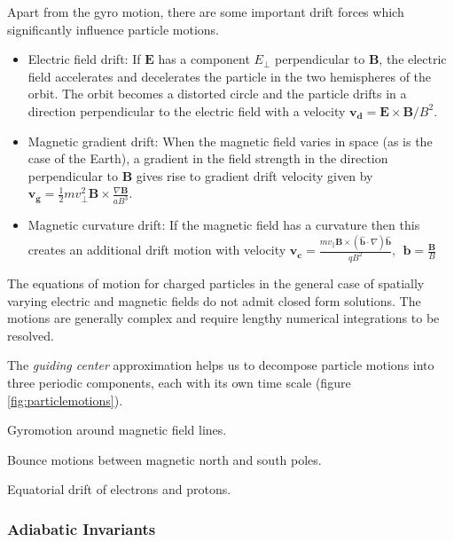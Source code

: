 Apart from the gyro motion, there are some important drift forces which significantly influence particle motions.

\begin{itemize}
    \item Electric field drift: If $\mathbf{E}$ has a component $E_{\perp}$ perpendicular to $\mathbf{B}$, the electric 
    field accelerates and decelerates the particle in the two hemispheres of the orbit. The orbit becomes 
    a distorted circle and the particle drifts in a direction perpendicular to the electric field with a velocity 
    $\mathbf{v_d} = \mathbf{E} \times \mathbf{B} / B^2$.

    \item Magnetic gradient drift: When the magnetic field varies in space (as is the case of the Earth), a 
    gradient in the field strength in the direction perpendicular to $\mathbf{B}$ gives rise to gradient 
    drift velocity given by $\mathbf{v_g} = \frac{1}{2} m v^2_{\perp}\mathbf{B} \times \frac{\nabla \mathbf{B}}{aB^3}$.

    \item Magnetic curvature drift: If the magnetic field has a curvature then this creates an additional 
    drift motion with velocity $\mathbf{v_c} = \frac{ m v_{\parallel} 
    \mathbf{B} \times (\hat{\mathbf{b}} \cdot \nabla) \hat{\mathbf{b}} }{qB^2}, 
    \ \ \mathbf{b} = \frac{\mathbf{B}}{B}$
\end{itemize}

The equations of motion for charged particles in the general case of spatially varying electric and magnetic fields 
do not admit closed form solutions. The motions are generally complex and require lengthy numerical integrations 
to be resolved.

The \emph{guiding center} approximation helps us to decompose particle motions into three periodic components, 
each with its own time scale (figure \ref{fig:particlemotions}).
\begin{enumerate*}
    \item Gyromotion around magnetic field lines.
    \item Bounce motions between magnetic north and south poles.
    \item Equatorial drift of electrons and protons.
\end{enumerate*}

\subsubsection*{Adiabatic Invariants}

